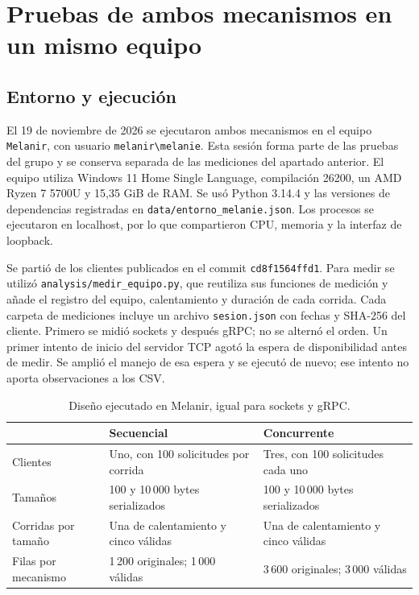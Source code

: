 \section{Pruebas de ambos mecanismos en un mismo equipo}
\label{sec:resultados-melanie}

\subsection{Entorno y ejecución}
El 19 de noviembre de 2026 se ejecutaron ambos mecanismos en el equipo
\texttt{Melanir}, con usuario \texttt{melanir\textbackslash melanie}.
Esta sesión forma parte de las pruebas del grupo y se conserva separada
de las mediciones del apartado anterior. El equipo utiliza Windows 11
Home Single Language, compilación 26200, un AMD Ryzen 7 5700U y
15,35 GiB de RAM. Se usó Python 3.14.4 y las versiones de dependencias
registradas en \texttt{data/entorno\_melanie.json}.
Los procesos se ejecutaron en localhost, por lo que compartieron CPU,
memoria y la interfaz de loopback.

Se partió de los clientes publicados en el commit \texttt{cd8f1564ffd1}.
Para medir se utilizó \texttt{analysis/}\allowbreak\texttt{medir\_equipo.py},
que reutiliza sus funciones de medición y añade el registro del equipo,
calentamiento y duración de cada corrida. Cada carpeta de mediciones
incluye un archivo \texttt{sesion.json} con fechas y SHA-256 del cliente.
Primero se midió sockets y después gRPC; no se alternó el orden.
Un primer intento de inicio del servidor TCP agotó la espera de
disponibilidad antes de medir. Se amplió el manejo de esa espera y
se ejecutó de nuevo; ese intento no aporta observaciones a los CSV.

\begin{table}[htbp]
\centering\small
\caption{Diseño ejecutado en Melanir, igual para sockets y gRPC.}
\begin{tabularx}{\linewidth}{lXX}
\toprule
 & Secuencial & Concurrente \\
\midrule
Clientes & Uno, con 100 solicitudes por corrida & Tres, con 100 solicitudes cada uno \\
Tamaños & 100 y 10\,000 bytes serializados & 100 y 10\,000 bytes serializados \\
Corridas por tamaño & Una de calentamiento y cinco válidas & Una de calentamiento y cinco válidas \\
Filas por mecanismo & 1\,200 originales; 1\,000 válidas & 3\,600 originales; 3\,000 válidas \\
\bottomrule
\end{tabularx}
\end{table}

